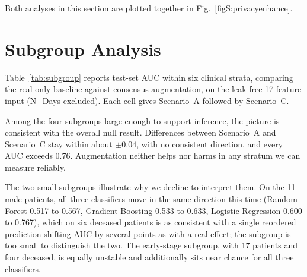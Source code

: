 \documentclass[journal,onecolumn]{IEEEtran}
\begin{document}
Both analyses in this section are plotted together in Fig.~\ref{figS:privacyenhance}.

\section{Subgroup Analysis}

Table~\ref{tab:subgroup} reports test-set AUC within six clinical strata, comparing the real-only baseline against consensus augmentation, on the leak-free 17-feature input (N\_Days excluded). Each cell gives Scenario~A followed by Scenario~C.

\begin{table}[!t]
  \centering
  \caption{Subgroup Test-Set AUC, N\_Days Excluded, Reported as Scenario A / Scenario C. Subgroups Below $n = 20$ Are Reported for Completeness Only}
  \label{tab:subgroup}
\end{table}

Among the four subgroups large enough to support inference, the picture is consistent with the overall null result. Differences between Scenario~A and Scenario~C stay within about $\pm 0.04$, with no consistent direction, and every AUC exceeds 0.76. Augmentation neither helps nor harms in any stratum we can measure reliably.

The two small subgroups illustrate why we decline to interpret them. On the 11 male patients, all three classifiers move in the same direction this time (Random Forest 0.517 to 0.567, Gradient Boosting 0.533 to 0.633, Logistic Regression 0.600 to 0.767), which on six deceased patients is as consistent with a single reordered prediction shifting AUC by several points as with a real effect; the subgroup is too small to distinguish the two. The early-stage subgroup, with 17 patients and four deceased, is equally unstable and additionally sits near chance for all three classifiers.
\end{document}
